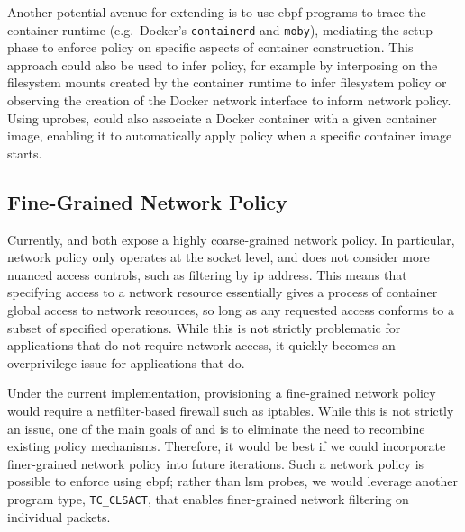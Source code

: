 Another potential avenue for extending \bpfcontain{} is to use \gls{ebpf} programs to
trace the container runtime (e.g.\ Docker's \texttt{containerd} and \texttt{moby}),
mediating the setup phase to enforce policy on specific aspects of container construction.
This approach could also be used to infer policy, for example by interposing on the
filesystem mounts created by the container runtime to infer filesystem policy or observing
the creation of the Docker network interface to inform network policy. Using uprobes,
\bpfcontain{} could also associate a Docker container with a given container image,
enabling it to automatically apply policy when a specific container image starts.


\subsection{Fine-Grained Network Policy}%
\label{ss:disc-fine-grained-network}

Currently, \bpfbox{} and \bpfcontain{} both expose a highly coarse-grained network policy.
In particular, network policy only operates at the socket level, and does not
consider more nuanced access controls, such as filtering by \gls{ip} address. This means
that specifying access to a network resource essentially gives a process of container
global access to network resources, so long as any requested access conforms to a subset
of specified operations. While this is not strictly problematic for applications that do
not require network access, it quickly becomes an overprivilege issue for applications
that do.

Under the current implementation, provisioning a fine-grained network policy would require
a netfilter-based firewall such as iptables. While this is not strictly an issue, one of
the main goals of \bpfbox{} and \bpfcontain{} is to eliminate the need to recombine
existing policy mechanisms. Therefore, it would be best if we could incorporate
finer-grained network policy into future iterations. Such a network policy is possible to
enforce using \gls{ebpf}; rather than \gls{lsm} probes, we would leverage another program
type, \texttt{TC\_CLSACT}, that enables finer-grained network filtering on individual packets.

